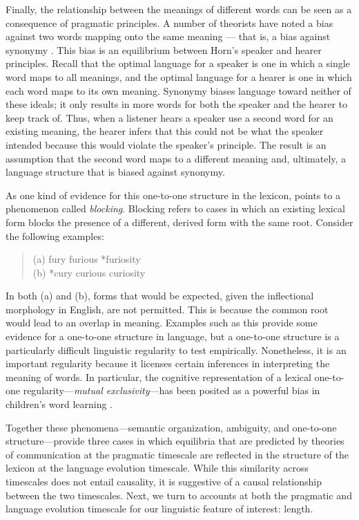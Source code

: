 Finally, the relationship between the meanings of different words can be seen as a consequence of pragmatic principles. A number of theorists have noted a bias against two words mapping onto the same meaning --- that is, a bias against synonymy \cite{saussure,kiparsky1983word,horn1984,clark1987principle,clark1988logic}. This bias is an equilibrium between Horn's speaker and hearer principles. Recall that the optimal language for a speaker is one in which a single word maps to all meanings, and the optimal language for a hearer is one in which each word maps to its own meaning. Synonymy biases language toward neither of these ideals; it only results in more words for both the speaker and the hearer to keep track of.  Thus, when a listener hears a speaker use a second word for an existing meaning, the hearer infers that this could not be what the speaker intended because this would violate the speaker's principle. The result is  an assumption that the second word maps to a different meaning and, ultimately, a language structure that is biased against synonymy.

As one kind of evidence for this one-to-one structure in the lexicon,  points to a phenomenon called {\it blocking}. Blocking refers to cases in which an existing lexical form blocks the presence of a different, derived form with the same root. Consider the following examples:
 \begin{quote}
 	(a) fury furious *furiosity\\
	(b) *cury curious curiosity
\end{quote}
In both (a) and (b), forms that would be expected, given the inflectional morphology in English, are not permitted. This is because the common root would lead to an overlap in meaning. Examples such as this provide some evidence for a one-to-one structure in language, but a one-to-one structure is a particularly difficult linguistic regularity to test empirically. Nonetheless, it is an important regularity because it licenses certain inferences in interpreting the meaning of words. In particular, the cognitive representation of a lexical one-to-one regularity---{\it mutual exclusivity}---has been posited as a powerful bias in children's word learning \cite{markman1988,markman2003}.

Together these phenomena---semantic organization, ambiguity, and one-to-one structure---provide three cases in which equilibria that are predicted by theories of communication at the pragmatic timescale are reflected in the structure of the lexicon at the language evolution timescale. While this similarity across timescales does not entail causality, it is suggestive of a causal relationship between the two timescales. Next, we turn to accounts at both the pragmatic and language evolution timescale for our linguistic feature of interest: length.

